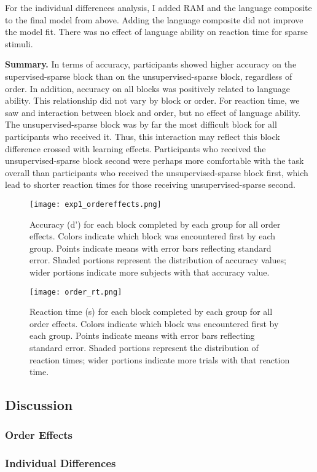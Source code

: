 \documentclass[../dissertation.tex]{subfiles}
\begin{document}
	For the individual differences analysis, I added RAM and the language composite to the final model from above. Adding the language composite did not improve the model fit. There was no effect of language ability on reaction time for sparse stimuli. \par
	\textbf{Summary.} In terms of accuracy, participants showed higher accuracy on the supervised-sparse block than on the unsupervised-sparse block, regardless of order. In addition, accuracy on all blocks was positively related to language ability. This relationship did not vary by block or order. For reaction time, we saw and interaction between block and order, but no effect of language ability. The unsupervised-sparse block was by far the most difficult block for all participants who received it. Thus, this interaction may reflect this block difference crossed with learning effects. Participants who received the unsupervised-sparse block second were perhaps more comfortable with the task overall than participants who received the unsupervised-sparse block first, which lead to shorter reaction times for those receiving unsupervised-sparse second.
	
\begin{figure}[H]
\vspace{-10pt}
\texttt{[image: exp1\_ordereffects.png]}
\caption[Accuracy plot for all order effects]{Accuracy (d') for each block completed by each group for all order effects. Colors indicate which block was encountered first by each group. Points indicate means with error bars reflecting standard error. Shaded portions represent the distribution of accuracy values; wider portions indicate more subjects with that accuracy value.}
\label{oes}
\vspace{-10pt}
\end{figure}	

\begin{figure}[H]
\vspace{-10pt}
\texttt{[image: order\_rt.png]}
\caption[Reaction time plot for all order effects]{Reaction time (s) for each block completed by each group for all order effects. Colors indicate which block was encountered first by each group. Points indicate means with error bars reflecting standard error. Shaded portions represent the distribution of reaction times; wider portions indicate more trials with that reaction time.}
\label{oe_rt}
\vspace{-10pt}
\end{figure}	
	
\subsection{Discussion}
\subsubsection{Order Effects}
	
\subsubsection{Individual Differences}
\end{document}
